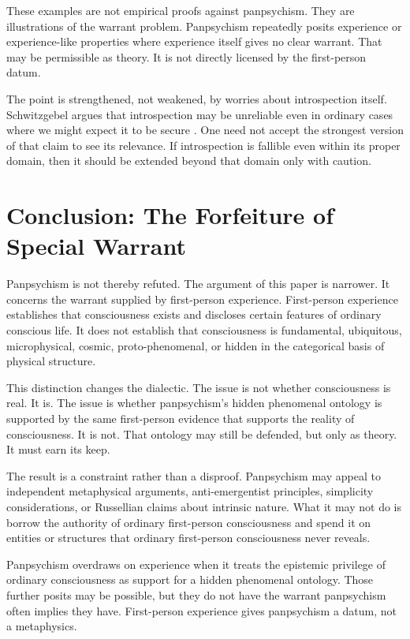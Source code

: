 \documentclass[12pt]{article}
\begin{document}
These examples are not empirical proofs against panpsychism. They are illustrations of the warrant problem. Panpsychism repeatedly posits experience or experience-like properties where experience itself gives no clear warrant. That may be permissible as theory. It is not directly licensed by the first-person datum.

The point is strengthened, not weakened, by worries about introspection itself. Schwitzgebel argues that introspection may be unreliable even in ordinary cases where we might expect it to be secure \citep{schwitzgebel2008,schwitzgebel2011}. One need not accept the strongest version of that claim to see its relevance. If introspection is fallible even within its proper domain, then it should be extended beyond that domain only with caution.

\section{Conclusion: The Forfeiture of Special Warrant}

Panpsychism is not thereby refuted. The argument of this paper is narrower. It concerns the warrant supplied by first-person experience. First-person experience establishes that consciousness exists and discloses certain features of ordinary conscious life. It does not establish that consciousness is fundamental, ubiquitous, microphysical, cosmic, proto-phenomenal, or hidden in the categorical basis of physical structure.

This distinction changes the dialectic. The issue is not whether consciousness is real. It is. The issue is whether panpsychism's hidden phenomenal ontology is supported by the same first-person evidence that supports the reality of consciousness. It is not. That ontology may still be defended, but only as theory. It must earn its keep.

The result is a constraint rather than a disproof. Panpsychism may appeal to independent metaphysical arguments, anti-emergentist principles, simplicity considerations, or Russellian claims about intrinsic nature. What it may not do is borrow the authority of ordinary first-person consciousness and spend it on entities or structures that ordinary first-person consciousness never reveals.

Panpsychism overdraws on experience when it treats the epistemic privilege of ordinary consciousness as support for a hidden phenomenal ontology. Those further posits may be possible, but they do not have the warrant panpsychism often implies they have. First-person experience gives panpsychism a datum, not a metaphysics.



\end{document}
